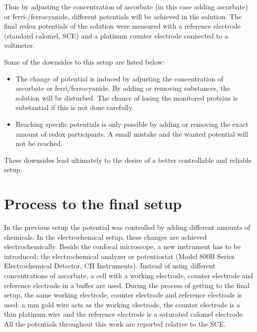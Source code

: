 \documentclass[twoside,single]{lion-msc}
\begin{document}
Thus by adjusting the concentration of ascorbate (in this case adding ascorbate) or ferri-/ferrocyanide, different potentials will be achieved in the solution. The final redox potentials of the solution were measured with a reference electrode (standard calomel, SCE) and a platinum counter electrode connected to a voltmeter.

Some of the downsides to this setup are listed below:
\begin{itemize}
\item The change of potential is induced by adjusting the concentration of ascorbate or ferri/ferrocyanide. By adding or removing substances, the solution will be disturbed. The chance of losing the monitored proteins is substantial if this is not done carefully. 
\item Reaching specific potentials is only possible by adding or removing the exact amount of redox participants. A small mistake and the wanted potential will not be reached. 
\end{itemize}

These downsides lead ultimately to the desire of a better controllable and reliable setup. 

\section{Process to the final setup}

In the previous setup the potential was controlled by adding different amounts of chemicals. In the electrochemical setup, these changes are achieved electrochemically. Beside the confocal microscope, a new instrument has to be introduced: the electrochemical analyzer or potentiostat (Model 800B Series Electrochemical Detector, CH Instruments). Instead of using different concentrations of ascorbate, a cell with a working electrode, counter electrode and reference electrode in a buffer are used. During the process of getting to the final setup, the same working electrode, counter electrode and reference electrode is used: a  mm gold wire acts as the working electrode, the counter electrode is a  thin platinum wire and the reference electrode is a saturated calomel electrode. All the potentials throughout this work are reported relative to the SCE.
\end{document}
